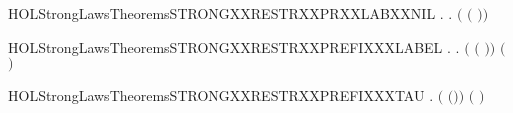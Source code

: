 \newcommand{\HOLStrongLawsTheoremsSTRONGXXRESTRXXNIL}{\UseVerbatim{HOLStrongLawsTheoremsSTRONGXXRESTRXXNIL}}
\begin{SaveVerbatim}{HOLStrongLawsTheoremsSTRONGXXRESTRXXPRXXLABXXNIL}
\HOLTokenTurnstile{} \HOLSymConst{\HOLTokenForall{}} .
        \HOLConst{\HOLTokenIn{}}  \HOLSymConst{\HOLTokenDisj{}}   \HOLConst{\HOLTokenIn{}}  \HOLSymConst{\HOLTokenImp{}}
       \HOLSymConst{\HOLTokenForall{}}.  \ensuremath{(}  \ensuremath{(} \HOLSymConst{\ensuremath{\ldotp}}\ensuremath{)}\ensuremath{)} 
\end{SaveVerbatim}
\newcommand{\HOLStrongLawsTheoremsSTRONGXXRESTRXXPRXXLABXXNIL}{\UseVerbatim{HOLStrongLawsTheoremsSTRONGXXRESTRXXPRXXLABXXNIL}}
\begin{SaveVerbatim}{HOLStrongLawsTheoremsSTRONGXXRESTRXXPREFIXXXLABEL}
\HOLTokenTurnstile{} \HOLSymConst{\HOLTokenForall{}} .
        \HOLConst{\HOLTokenNotIn{}}  \HOLSymConst{\HOLTokenConj{}}   \HOLConst{\HOLTokenNotIn{}}  \HOLSymConst{\HOLTokenImp{}}
       \HOLSymConst{\HOLTokenForall{}}.  \ensuremath{(}  \ensuremath{(} \HOLSymConst{\ensuremath{\ldotp}}\ensuremath{)}\ensuremath{)} \ensuremath{(} \HOLSymConst{\ensuremath{\ldotp}}  \ensuremath{)}
\end{SaveVerbatim}
\newcommand{\HOLStrongLawsTheoremsSTRONGXXRESTRXXPREFIXXXLABEL}{\UseVerbatim{HOLStrongLawsTheoremsSTRONGXXRESTRXXPREFIXXXLABEL}}
\begin{SaveVerbatim}{HOLStrongLawsTheoremsSTRONGXXRESTRXXPREFIXXXTAU}
\HOLTokenTurnstile{} \HOLSymConst{\HOLTokenForall{}} .  \ensuremath{(}  \ensuremath{(}\HOLConst{\ensuremath{\tau}}\HOLSymConst{\ensuremath{\ldotp}}\ensuremath{)}\ensuremath{)} \ensuremath{(}\HOLConst{\ensuremath{\tau}}\HOLSymConst{\ensuremath{\ldotp}}  \ensuremath{)}
\end{SaveVerbatim}
\newcommand{\HOLStrongLawsTheoremsSTRONGXXRESTRXXPREFIXXXTAU}{\UseVerbatim{HOLStrongLawsTheoremsSTRONGXXRESTRXXPREFIXXXTAU}}
